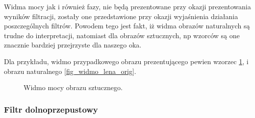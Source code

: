 \documentclass{classrep}
\begin{document}
Widma mocy jak i również fazy, nie będą prezentowane przy okazji prezentowania wyników filtracji, zostały one przedstawione przy okazji wyjaśnienia działania poszczególnych filtrów. Powodem tego jest fakt, iż widma obrazów naturalnych są trudne do interpretacji, natomiast dla obrazów sztucznych, np wzorców są one znacznie bardziej przejrzyste dla naszego oka.

Dla przykładu, widmo przypadkowego obrazu prezentującego pewien wzorzec \ref{fig_pattern}, i obrazu naturalnego \ref{fig_widmo_lena_orig}.

 \begin{figure}[H]
  \centering
  \caption{Widmo mocy obrazu sztucznego.}
  \label{fig_pattern}
\end{figure}




\subsubsection{Filtr dolnoprzepustowy}
\end{document}
